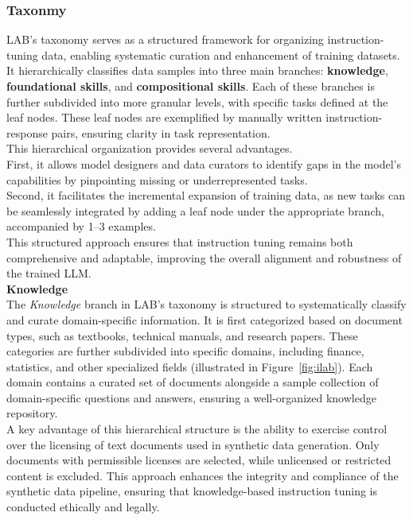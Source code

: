 \documentclass[12pt]{article}
\begin{document}
\subsubsection{Taxonmy}
LAB's taxonomy serves as a structured framework for organizing instruction-tuning data, enabling systematic curation and enhancement of training datasets. It hierarchically classifies data samples into three main branches: \textbf{knowledge}, \textbf{foundational skills}, and \textbf{compositional skills}. Each of these branches is further subdivided into more granular levels, with specific tasks defined at the leaf nodes. These leaf nodes are exemplified by manually written instruction-response pairs, ensuring clarity in task representation.\vspace{14pt}\\
This hierarchical organization provides several advantages.\vspace{14pt}\\
First, it allows model designers and data curators to identify gaps in the model’s capabilities by pinpointing missing or underrepresented tasks.\vspace{14pt}\\
Second, it facilitates the incremental expansion of training data, as new tasks can be seamlessly integrated by adding a leaf node under the appropriate branch, accompanied by 1–3 examples.\vspace{14pt}\\
This structured approach ensures that instruction tuning remains both comprehensive and adaptable, improving the overall alignment and robustness of the trained LLM.\vspace{14pt}\\
\textbf{Knowledge}\\
The \textit{Knowledge} branch in LAB’s taxonomy is structured to systematically classify and curate domain-specific information. It is first categorized based on document types, such as textbooks, technical manuals, and research papers. These categories are further subdivided into specific domains, including finance, statistics, and other specialized fields (illustrated in Figure~\ref{fig:ilab}). Each domain contains a curated set of documents alongside a sample collection of domain-specific questions and answers, ensuring a well-organized knowledge repository.\vspace{14pt}\\
A key advantage of this hierarchical structure is the ability to exercise control over the licensing of text documents used in synthetic data generation. Only documents with permissible licenses are selected, while unlicensed or restricted content is excluded. This approach enhances the integrity and compliance of the synthetic data pipeline, ensuring that knowledge-based instruction tuning is conducted ethically and legally.\vspace{14pt}\\
\end{document}
